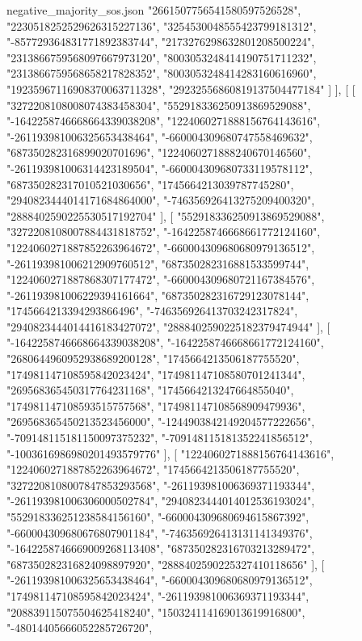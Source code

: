 \begin{filecontents*}[overwrite]{negative_majority_sos.json}
    "2661507756541580597526528",
    "2230518252529626315227136",
    "3254530048555423799181312",
    "-857729364831771892383744",
    "2173276298632801208500224",
    "2313866759568097667973120",
    "8003053248414190751711232",
    "2313866759568658217828352",
    "8003053248414283160616960",
    "19235967116908370063711328",
    "29232556860819137504477184"
   ]
  ],
  [
   [
    "3272208108008074383458304",
    "552918336250913869529088",
    "-1642258746668664339038208",
    "1224060271888156764143616",
    "-261193981006325653438464",
    "-660004309680747558469632",
    "687350282316899020701696",
    "1224060271888240670146560",
    "-261193981006314423189504",
    "-660004309680733119578112",
    "687350282317010521030656",
    "1745664213039787745280",
    "2940823444014171684864000",
    "-746356926413275209400320",
    "2888402590225530517192704"
   ],
   [
    "552918336250913869529088",
    "3272208108007884431818752",
    "-1642258746668661772124160",
    "1224060271887852263964672",
    "-660004309680680979136512",
    "-261193981006212909760512",
    "687350282316881533599744",
    "1224060271887868307177472",
    "-660004309680721167384576",
    "-261193981006229394161664",
    "687350282316729123078144",
    "1745664213394293866496",
    "-746356926413703242317824",
    "2940823444014416183427072",
    "2888402590225182379474944"
   ],
   [
    "-1642258746668664339038208",
    "-1642258746668661772124160",
    "2680644960952938689200128",
    "1745664213506187755520",
    "174981147108595842023424",
    "174981147108580701241344",
    "269568365450317764231168",
    "1745664213247664855040",
    "174981147108593515757568",
    "174981147108568909479936",
    "269568365450213523456000",
    "-1244903842149204577222656",
    "-709148115181150097375232",
    "-709148115181352241856512",
    "-1003616986980201493579776"
   ],
   [
    "1224060271888156764143616",
    "1224060271887852263964672",
    "1745664213506187755520",
    "3272208108007847853293568",
    "-261193981006369371193344",
    "-261193981006306000502784",
    "2940823444014012536193024",
    "552918336251238584156160",
    "-660004309680694615867392",
    "-660004309680676807901184",
    "-746356926413131141349376",
    "-1642258746669009268113408",
    "687350282316703213289472",
    "687350282316824098897920",
    "2888402590225327410118656"
   ],
   [
    "-261193981006325653438464",
    "-660004309680680979136512",
    "174981147108595842023424",
    "-261193981006369371193344",
    "208839115075504625418240",
    "150324114169013619916800",
    "-48014405666052285726720",

\end{filecontents*}
